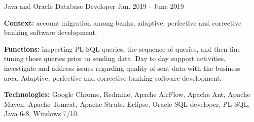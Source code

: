 \begin{cventries}
  \cventry
    {Java and Oracle Database Developer} %
    {} %
    {} %
    {Jan. 2019 - June 2019} %
    {
      \begin{cvitems} %
		\item[] {\textbf{Context:} account migration among banks, adaptive, perfective and corrective banking software development. 
}
		\item[] {\textbf{Functions:} inspecting PL-SQL queries, the sequence of queries, and then fine tuning those queries prior to sending data. Day to day support activities, investigate and address issues regarding quality of sent data with the business area. Adaptive, perfective and corrective banking software development.}		
		\item[] {\textbf{Technologies:} 
		\textcolor{rainbowcolor-olive}{Google Chrome}, 
		\textcolor{rainbowcolor-olive}{Redmine}, 
		\textcolor{rainbowcolor-olive}{Apache AirFlow}, 
		\textcolor{rainbowcolor-olive}{Apache Ant}, 
		\textcolor{rainbowcolor-olive}{Apache Maven}, 
		\textcolor{rainbowcolor-olive}{Apache Tomcat}, 
		\textcolor{rainbowcolor-olive}{Apache Struts}, 
		\textcolor{rainbowcolor-olive}{Eclipse}, 
		\textcolor{rainbowcolor-olive}{Oracle SQL developer},
		\textcolor{rainbowcolor-indigo}{PL-SQL}, 
		\textcolor{rainbowcolor-indigo}{Java 6-8}, 
		\textcolor{rainbowcolor-orange}{Windows 7/10}.}		
      \end{cvitems}
    } 
    

\end{cventries}
